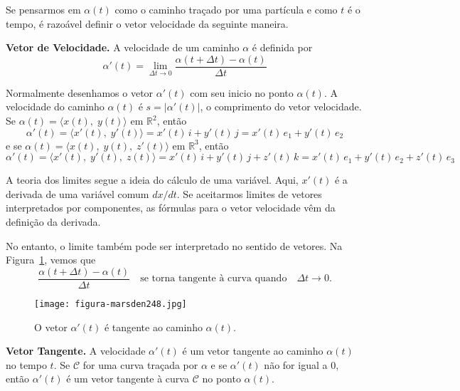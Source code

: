 Se pensarmos em \(\alpha(t)\) como o caminho traçado por uma partícula e como \(t\) é o tempo, é razoável definir o vetor velocidade da seguinte
maneira.

\noindent\textbf{Vetor de Velocidade.}
A velocidade de um caminho \(\alpha\) é definida por
\begin{equation*}
  \alpha'(t)=\lim_{\Delta t \to 0}\frac{\alpha(t+\Delta t)-\alpha(t)}{\Delta t}
\end{equation*}

Normalmente desenhamos o vetor \(\alpha'(t)\) com seu inicio no ponto \(\alpha(t)\). A velocidade do caminho \(\alpha(t)\) é \(s =|\alpha'(t)|\), o comprimento do vetor velocidade. Se \(\alpha(t) = \langle x(t), \; y(t) \rangle\) em \(\mathbb{R}^{2}\), então
\begin{equation*}
\alpha'(t) = \langle x'(t),\; y'(t)\rangle = x'(t)\,i+ y'(t)\,j=x'(t)\,e_{1}+ y'(t)\,e_{2}
\end{equation*}
e se \(\alpha(t) = \langle x(t), \; y (t), \; z'(t)\rangle\) em \(\mathbb{R}^{3}\), então
\begin{equation*}
\alpha'(t) = \langle x'(t),\; y'(t),\; z(t)\rangle= x'(t)\,i+ y'(t)\,j+z'(t)\, k=x'(t)\,e_{1}+ y'(t)\,e_{2}+z'(t)\,e_{3}
\end{equation*}

A teoria dos limites segue a ideia do cálculo de uma variável. Aqui, \(x'(t)\) é a derivada de uma variável comum \(dx/dt\). Se aceitarmos limites de vetores interpretados por componentes, as fórmulas para o vetor velocidade vêm da definição da derivada.

No entanto, o limite também pode ser interpretado no sentido de vetores. Na Figura~\ref{fig:248}, vemos que
\begin{equation*}
\frac{\alpha(t + \Delta t)-\alpha(t)}{\Delta t}\quad  \text{se torna tangente à curva quando}\quad  \Delta t \to 0.
\end{equation*}

\begin{figure}[!h]
  \centering
  \texttt{[image: figura-marsden248.jpg]}
  \caption{O vetor \(\alpha'(t)\) é tangente ao caminho \(\alpha(t)\).}\label{fig:248}
\end{figure}

%
\noindent\textbf{Vetor Tangente.}
%
A velocidade \(\alpha'(t)\) é um vetor tangente ao caminho \(\alpha(t)\) no tempo \(t\). Se \(\mathcal{C}\) for uma curva traçada por \(\alpha\) e se \(\alpha'(t)\) não for igual a \(0\), então \(\alpha'(t)\) é um vetor tangente à curva \(\mathcal{C}\) no ponto \(\alpha(t)\).


